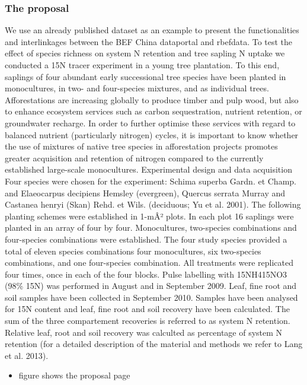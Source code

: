 \documentclass[]{article}
\begin{document}
\subsubsection{The proposal}

We use an already published dataset as an example to present the
functionalities and interlinkages between the BEF China dataportal and
rbefdata. To test the effect of species richness on system N retention
and tree sapling N uptake we conducted a 15N tracer experiment in a
young tree plantation. To this end, saplings of four abundant early
successional tree species have been planted in monocultures, in two- and
four-species mixtures, and as individual trees. Afforestations are
increasing globally to produce timber and pulp wood, but also to enhance
ecosystem services such as carbon sequestration, nutrient retention, or
groundwater recharge. In order to further optimise these services with
regard to balanced nutrient (particularly nitrogen) cycles, it is
important to know whether the use of mixtures of native tree species in
afforestation projects promotes greater acquisition and retention of
nitrogen compared to the currently established large-scale monocultures.
Experimental design and data acquisition Four species were chosen for
the experiment: Schima superba Gardn. et Champ. and Elaeocarpus
decipiens Hemsley (evergreen), Quercus serrata Murray and Castanea
henryi (Skan) Rehd. et Wils. (deciduous; Yu et al. 2001). The following
planting schemes were established in 1-mÂ² plots. In each plot 16
saplings were planted in an array of four by four. Monocultures,
two-species combinations and four-species combinations were established.
The four study species provided a total of eleven species combinations
four monocultures, six two-species combinations, and one four-species
combination. All treatments were replicated four times, once in each of
the four blocks. Pulse labelling with 15NH415NO3 (98\% 15N) was
performed in August and in September 2009. Leaf, fine root and soil
samples have been collected in September 2010. Samples have been
analysed for 15N content and leaf, fine root and soil recovery have been
calculated. The sum of the three compartement recoveries is referred to
as system N retention. Relative leaf, root and soil recovery was
calculted as percentage of system N retention (for a detailed
description of the material and methods we refer to Lang et al. 2013).

\begin{itemize}
\itemsep1pt\parskip0pt
\item
  figure shows the proposal page
\end{itemize}
\end{document}
